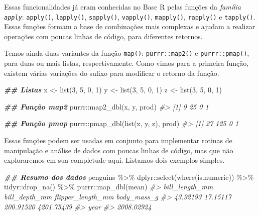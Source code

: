 \documentclass[
]{book}
\newenvironment{Shaded}{\begin{snugshade}}{\end{snugshade}}
\newcommand{\CommentTok}[1]{\textcolor[rgb]{0.37,0.37,0.37}{\textit{#1}}}
\newcommand{\DecValTok}[1]{\textcolor[rgb]{0.06,0.06,0.06}{#1}}
\newcommand{\DocumentationTok}[1]{\textcolor[rgb]{0.37,0.37,0.37}{\textbf{\textit{#1}}}}
\newcommand{\FunctionTok}[1]{\textcolor[rgb]{0,0,0}{#1}}
\newcommand{\NormalTok}[1]{#1}
\newcommand{\OtherTok}[1]{\textcolor[rgb]{0.37,0.37,0.37}{#1}}
\newcommand{\SpecialCharTok}[1]{\textcolor[rgb]{0,0,0}{#1}}
\begin{document}
Essas funcionalidades já eram conhecidas no Base R pelas funções da \emph{família \texttt{apply}}: \texttt{apply()}, \texttt{lapply()}, \texttt{sapply()}, \texttt{vapply()}, \texttt{mapply()}, \texttt{rapply()} e \texttt{tapply()}. Essas funções formam a base de combinações mais complexas e ajudam a realizar operações com poucas linhas de código, para diferentes retornos.

Temos ainda duas variantes da função \texttt{map()}: \texttt{purrr::map2()} e \texttt{purrr::pmap()}, para duas ou mais listas, respectivamente. Como vimos para a primeira função, existem várias variações do sufixo para modificar o retorno da função.

\begin{Shaded}
\begin{Highlighting}[]
\DocumentationTok{\#\# Listas}
\NormalTok{x }\OtherTok{\textless{}{-}} \FunctionTok{list}\NormalTok{(}\DecValTok{3}\NormalTok{, }\DecValTok{5}\NormalTok{, }\DecValTok{0}\NormalTok{, }\DecValTok{1}\NormalTok{)}
\NormalTok{y }\OtherTok{\textless{}{-}} \FunctionTok{list}\NormalTok{(}\DecValTok{3}\NormalTok{, }\DecValTok{5}\NormalTok{, }\DecValTok{0}\NormalTok{, }\DecValTok{1}\NormalTok{)}
\NormalTok{z }\OtherTok{\textless{}{-}} \FunctionTok{list}\NormalTok{(}\DecValTok{3}\NormalTok{, }\DecValTok{5}\NormalTok{, }\DecValTok{0}\NormalTok{, }\DecValTok{1}\NormalTok{)}

\DocumentationTok{\#\# Função map2}
\NormalTok{purrr}\SpecialCharTok{::}\FunctionTok{map2\_dbl}\NormalTok{(x, y, prod)}
\CommentTok{\#\textgreater{} [1]  9 25  0  1}

\DocumentationTok{\#\# Função pmap}
\NormalTok{purrr}\SpecialCharTok{::}\FunctionTok{pmap\_dbl}\NormalTok{(}\FunctionTok{list}\NormalTok{(x, y, z), prod)}
\CommentTok{\#\textgreater{} [1]  27 125   0   1}
\end{Highlighting}
\end{Shaded}

Essas funções podem ser usadas em conjunto para implementar rotinas de manipulação e análise de dados com poucas linhas de código, mas que não exploraremos em sua completude aqui. Listamos dois exemplos simples.

\begin{Shaded}
\begin{Highlighting}[]
\DocumentationTok{\#\# Resumo dos dados}
\NormalTok{penguins }\SpecialCharTok{\%\textgreater{}\%} 
\NormalTok{  dplyr}\SpecialCharTok{::}\FunctionTok{select}\NormalTok{(}\FunctionTok{where}\NormalTok{(is.numeric)) }\SpecialCharTok{\%\textgreater{}\%} 
\NormalTok{  tidyr}\SpecialCharTok{::}\FunctionTok{drop\_na}\NormalTok{() }\SpecialCharTok{\%\textgreater{}\%} 
\NormalTok{  purrr}\SpecialCharTok{::}\FunctionTok{map\_dbl}\NormalTok{(mean)}
\CommentTok{\#\textgreater{}    bill\_length\_mm     bill\_depth\_mm flipper\_length\_mm       body\_mass\_g }
\CommentTok{\#\textgreater{}          43.92193          17.15117         200.91520        4201.75439 }
\CommentTok{\#\textgreater{}              year }
\CommentTok{\#\textgreater{}        2008.02924}
\end{Highlighting}
\end{Shaded}
\end{document}
